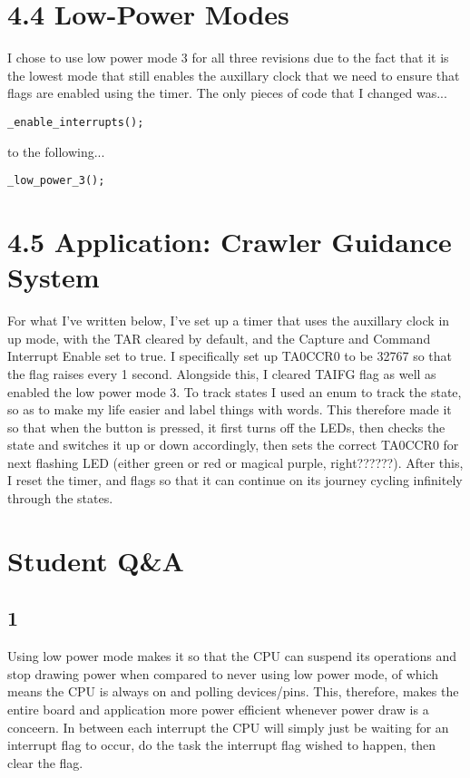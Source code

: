 \documentclass{article}
\begin{document}
\section{4.4 Low-Power Modes}
I chose to use low power mode 3 for all three revisions due to the fact that it is the lowest mode that still enables the auxillary clock that we need to ensure that flags are enabled using the timer. The only pieces of code that I changed was...
\begin{lstlisting}
_enable_interrupts();
\end{lstlisting}
to the following...
\begin{lstlisting}
_low_power_3();
\end{lstlisting}

\section{4.5 Application: Crawler Guidance System}
For what I've written below, I've set up a timer that uses the auxillary clock in up mode, with the TAR cleared by default, and the Capture and Command Interrupt Enable set to true. I specifically set up TA0CCR0 to be 32767 so that the flag raises every 1 second. Alongside this, I cleared TAIFG flag as well as enabled the low power mode 3. To track states I used an enum to track the state, so as to make my life easier and label things with words. This therefore made it so that when the button is pressed, it first turns off the LEDs, then checks the state and switches it up or down accordingly, then sets the correct TA0CCR0 for next flashing LED (either green or red or magical purple, right??????). After this, I reset the timer, and flags so that it can continue on its journey cycling infinitely through the states.


\section{Student Q\&A}
\subsection{1}
Using low power mode makes it so that the CPU can suspend its operations and stop drawing power when compared to never using low power mode, of which means the CPU is always on and polling devices/pins. This, therefore, makes the entire board and application more power efficient whenever power draw is a conceern. In between each interrupt the CPU will simply just be waiting for an interrupt flag to occur, do the task the interrupt flag wished to happen, then clear the flag.
\end{document}

